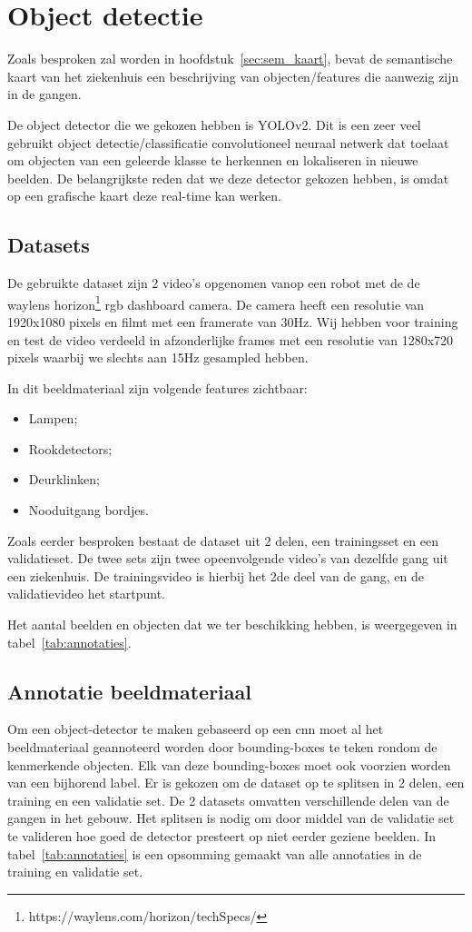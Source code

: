 \section{Object detectie}\label{sec:object_detectie}

Zoals besproken zal worden in hoofdstuk~\ref{sec:sem_kaart}, bevat de semantische kaart van het ziekenhuis een beschrijving van objecten/features die aanwezig zijn in de gangen.

De object detector die we gekozen hebben is YOLOv2\cite{yolov22016}.
Dit is een zeer veel gebruikt object detectie/classificatie convolutioneel neuraal netwerk dat toelaat om objecten van een geleerde klasse te herkennen en lokaliseren in nieuwe beelden.
De belangrijkste reden dat we deze detector gekozen hebben, is omdat op een grafische kaart deze real-time kan werken.

\subsection{Datasets}
De gebruikte dataset zijn 2 video's opgenomen vanop een robot met de de waylens horizon\footnote{https://waylens.com/horizon/techSpecs/} \gls{rgb} dashboard camera.
De camera heeft een resolutie van 1920x1080 pixels en filmt met een framerate van 30Hz.
Wij hebben voor training en test de video verdeeld in afzonderlijke frames met een resolutie van 1280x720 pixels waarbij we slechts
aan 15Hz gesampled hebben.

In dit beeldmateriaal zijn volgende features zichtbaar:
\begin{itemize}
    \item Lampen;
    \item Rookdetectors;
    \item Deurklinken;
    \item Nooduitgang bordjes.
\end{itemize}

Zoals eerder besproken bestaat de dataset uit 2 delen, een trainingsset en een validatieset.
De twee sets zijn twee opeenvolgende video's van dezelfde gang uit een ziekenhuis.
De trainingsvideo is hierbij het 2de deel van de gang, en de validatievideo het startpunt.

Het aantal beelden en objecten dat we ter beschikking hebben, is weergegeven in tabel~\ref{tab:annotaties}.

\subsection{Annotatie beeldmateriaal}
Om een object-detector te maken gebaseerd op een \gls{cnn} moet al het beeldmateriaal geannoteerd worden door bounding-boxes te teken rondom de kenmerkende objecten.
Elk van deze bounding-boxes moet ook voorzien worden van een bijhorend label.
Er is gekozen om de dataset op te splitsen in 2 delen, een training en een validatie set.
De 2 datasets omvatten verschillende delen van de gangen in het gebouw.
Het splitsen is nodig om door middel van de validatie set te valideren hoe goed de detector presteert op niet eerder geziene beelden.
In tabel~\ref{tab:annotaties} is een opsomming gemaakt van alle annotaties in de training en validatie set.

